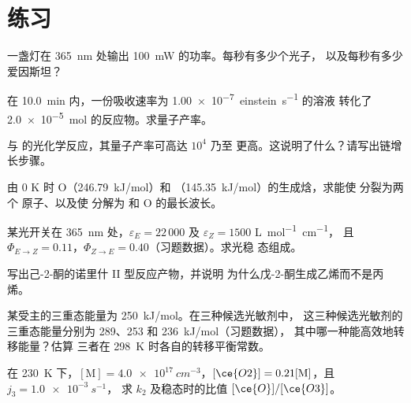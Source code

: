 \section{练习}

\begin{exercise}[$\star$]\label{exo:b3:photochemistry:1}
一盏灯在 \qty{365}{nm} 处输出 \qty{100}{mW} 的功率。每秒有多少个光子，
以及每秒有多少爱因斯坦？
\end{exercise}

\begin{exercise}[$\star$]\label{exo:b3:photochemistry:2}
在 \qty{10.0}{min} 内，一份吸收速率为 \qty{1.00e-7}{einstein.s^{-1}} 的溶液
转化了 \qty{2.0e-5}{mol} 的反应物。求量子产率。
\end{exercise}

\begin{exercise}[$\star$]\label{exo:b3:photochemistry:3}
 与  的光化学反应，其量子产率可高达 $10^4$ 乃至
更高。这说明了什么？请写出链增长步骤。
\end{exercise}

\begin{exercise}[$\star$]\label{exo:b3:photochemistry:4}
由 0 K 时 O（\qty{246.79}{kJ/mol}）和 
（\qty{145.35}{kJ/mol}）的生成焓，求能使  分裂为两个
原子、以及使  分解为  和 O 的最长波长。
\end{exercise}

\begin{exercise}[$\star\star$]\label{exo:b3:photochemistry:5}
某光开关在 \qty{365}{nm} 处，$\varepsilon_E = 22\,000$ 及 $\varepsilon_Z = 1500$ \unit{L.mol^{-1}.cm^{-1}}，
且 $\Phi_{E\to Z} = 0.11$，$\Phi_{Z\to E} = 0.40$（习题数据）。求光稳
态组成。
\end{exercise}

\begin{exercise}[$\star\star$]\label{exo:b3:photochemistry:6}
写出己-2-酮的诺里什 II 型反应产物，并说明
为什么戊-2-酮生成乙烯而不是丙烯。
\end{exercise}

\begin{exercise}[$\star\star$]\label{exo:b3:photochemistry:7}
某受主的三重态能量为 \qty{250}{kJ/mol}。在三种候选光敏剂中，
这三种候选光敏剂的三重态能量分别为 289、253 和 \qty{236}{kJ/mol}（习题数据），
其中哪一种能高效地转移能量？估算
三者在 \qty{298}{K} 时各自的转移平衡常数。
\end{exercise}

\begin{exercise}[$\star\star$]\label{exo:b3:photochemistry:8}
在 \qty{230}{K} 下，$[\mathrm M] = \qty{4.0e17}{cm^{-3}}$，$[\ce{O2}] = 0.21[\mathrm M]$，且 $j_3 = \qty{1.0e-3}{s^{-1}}$，
求 $k_2$ 及稳态时的比值 $[\ce{O}]/[\ce{O3}]$。
\end{exercise}


